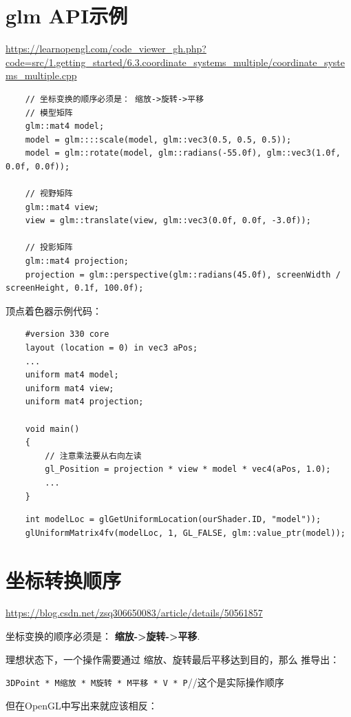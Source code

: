 \documentclass[UTF8,a4paper,12pt]{ctexbook}
\begin{document}
		
		
	\section{glm API示例}
		
		\url{https://learnopengl.com/code_viewer_gh.php?code=src/1.getting_started/6.3.coordinate_systems_multiple/coordinate_systems_multiple.cpp}
	
		\begin{lstlisting}
	// 坐标变换的顺序必须是： 缩放->旋转->平移
	// 模型矩阵
	glm::mat4 model;
	model = glm::::scale(model, glm::vec3(0.5, 0.5, 0.5));
	model = glm::rotate(model, glm::radians(-55.0f), glm::vec3(1.0f, 0.0f, 0.0f));	
	
	// 视野矩阵
	glm::mat4 view;
	view = glm::translate(view, glm::vec3(0.0f, 0.0f, -3.0f));
	
	// 投影矩阵
	glm::mat4 projection;
	projection = glm::perspective(glm::radians(45.0f), screenWidth / screenHeight, 0.1f, 100.0f);	
		\end{lstlisting}

		顶点着色器示例代码：		
		\begin{lstlisting}
	#version 330 core
	layout (location = 0) in vec3 aPos;
	...
	uniform mat4 model;
	uniform mat4 view;
	uniform mat4 projection;
	
	void main()
	{
	    // 注意乘法要从右向左读
	    gl_Position = projection * view * model * vec4(aPos, 1.0);
	    ...
	}	
		\end{lstlisting}
		
		\begin{lstlisting}
	int modelLoc = glGetUniformLocation(ourShader.ID, "model"));
	glUniformMatrix4fv(modelLoc, 1, GL_FALSE, glm::value_ptr(model));		
		\end{lstlisting}
	
	
	\section{坐标转换顺序}
		\url{https://blog.csdn.net/zsq306650083/article/details/50561857}
		
		坐标变换的顺序必须是： \textbf{缩放->旋转->平移}.
		
		理想状态下，一个操作需要通过  缩放、旋转最后平移达到目的，那么 推导出：
		
		\verb|3DPoint * M缩放 * M旋转 * M平移 * V * P|//这个是实际操作顺序
		
		但在OpenGL中写出来就应该相反：
		
\end{document}
